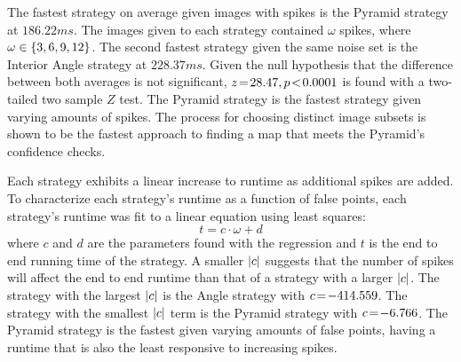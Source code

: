 %
%
%
%
The fastest strategy on average given images with spikes is the Pyramid strategy at $186.22\si{ms}$.
The images given to each strategy contained $\omega$ spikes, where $\omega \in \left\{  3, 6, 9, 12  \right\}$.
The second fastest strategy given the same noise set is the Interior Angle strategy at $228.37\si{ms}$.
Given the null hypothesis that the difference between both averages is not significant, $z \!=\! 28.47, p\!<\!0.0001$ is
found with a two-tailed two sample $Z$ test.
The Pyramid strategy is the fastest strategy given varying amounts of spikes.
The process for choosing distinct image subsets is shown to be the fastest approach to finding a map that meets the Pyramid's confidence checks.

%
%
%
Each strategy exhibits a linear increase to runtime as additional spikes are added.
To characterize each strategy's runtime as a function of false points, each strategy's runtime was fit to a linear equation using least squares:
\begin{equation}
    t = c\cdot\omega + d
\end{equation}
where $c$ and $d$ are the parameters found with the regression and $t$ is the end to end running time of the strategy.
A smaller $\left| c \right|$ suggests that the number of spikes will affect the end to end runtime than that of a strategy with a larger $\left| c \right|$.
The strategy with the largest $\left| c \right|$ is the Angle strategy with $c \!=\! -414.559$.
The strategy with the smallest $\left| c \right|$ term is the Pyramid strategy with $c \!=\! -6.766$.
The Pyramid strategy is the fastest given varying amounts of false points, having a runtime that is also the least responsive to increasing spikes.

